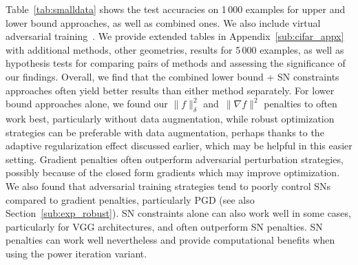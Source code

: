Table~\ref{tab:smalldata} shows the test accuracies on 1\,000 examples for upper and lower bound approaches,
as well as combined ones.
We also include virtual adversarial training~\citep[VAT,][]{miyato2018virtual}.
We provide extended tables in Appendix~\ref{sub:cifar_appx} with additional methods,
other geometries, results for 5\,000 examples, as well as hypothesis tests for
comparing pairs of methods and assessing the significance of our findings.
Overall, we find that the combined lower bound + SN constraints approaches often
yield better results than either method separately.
For lower bound approaches alone, we found our $\|f\|_\delta^2$ and~$\|\nabla f\|^2$ penalties to often
work best, particularly without data augmentation,
while robust optimization strategies can be preferable with data augmentation,
perhaps thanks to the adaptive regularization effect discussed earlier, which may be helpful in
this easier setting.
Gradient penalties often outperform adversarial perturbation strategies,
possibly because of the closed form gradients which may improve optimization.
We also found that adversarial training strategies tend to poorly control SNs compared to
gradient penalties, particularly PGD (see also Section~\ref{sub:exp_robust}).
SN constraints alone can also work well in some cases, particularly for VGG architectures,
and often outperform SN penalties.
SN penalties can work well nevertheless and provide computational benefits when using the power iteration variant.


